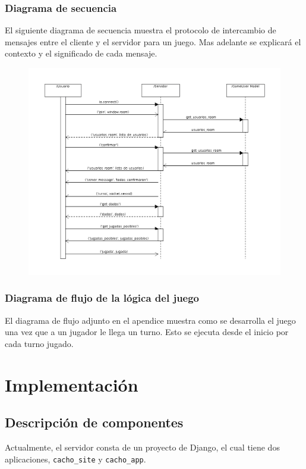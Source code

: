 \documentclass[a4paper,11pt]{article}
\begin{document}
\newpage
\subsubsection{Diagrama de secuencia}
El siguiente diagrama de secuencia muestra el protocolo de intercambio de mensajes
entre el cliente y el servidor para un juego. Mas adelante se explicará el contexto
y el significado de cada mensaje.
\begin{figure}[h!]
	\centering
	\includegraphics[width=\textwidth]{seq_juego.png}
\end{figure}

\subsubsection{Diagrama de flujo de la lógica del juego}
El diagrama de flujo adjunto en el apendice muestra como se desarrolla el juego una vez
que a un jugador le llega un turno. Esto se ejecuta desde el inicio por cada
turno jugado.

\newpage
\section{Implementación}
\subsection{Descripción de componentes}
Actualmente, el servidor consta de un proyecto de Django, el cual tiene dos aplicaciones,
\texttt{cacho\_site} y \texttt{cacho\_app}.\\
\end{document}
